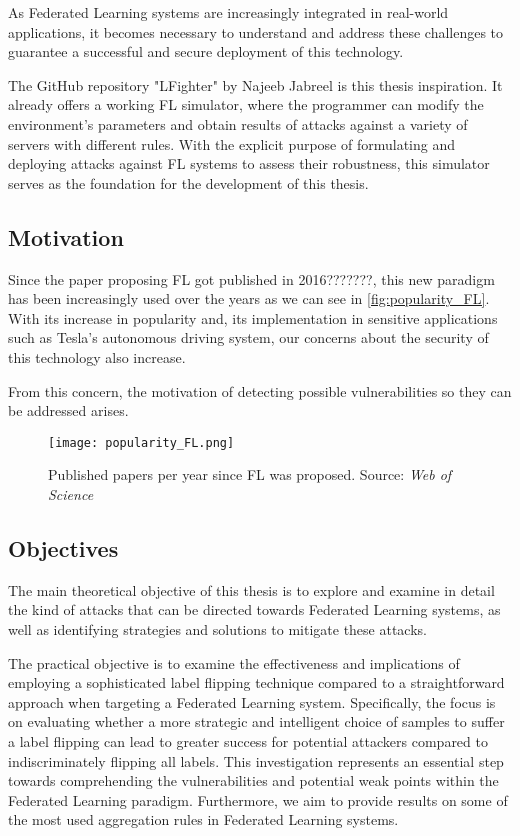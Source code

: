 As Federated Learning systems are increasingly integrated in real-world applications, it becomes necessary to understand and address these challenges to guarantee a successful and secure deployment of this technology.


The GitHub repository "LFighter" \cite{LFighter_code} by Najeeb Jabreel is this thesis inspiration. It already offers a working FL simulator, where the programmer can modify the environment's parameters and obtain results of attacks against a variety of servers with different rules. With the explicit purpose of formulating and deploying attacks against FL systems to assess their robustness, this simulator serves as the foundation for the development of this thesis.



\subsection{Motivation}
Since the paper proposing FL got published in 2016???????, this new paradigm has been increasingly used over the years as we can see in \autoref{fig:popularity_FL}.
With its increase in popularity and, its implementation in sensitive applications such as Tesla's autonomous driving system, our concerns about the security of this technology also increase.

From this concern, the motivation of detecting possible vulnerabilities so they can be addressed arises. 

\begin{figure}[h!]
        \centering %
        \texttt{[image: popularity\_FL.png]}
        \caption{Published papers per year since FL was proposed. Source: \textit{Web of Science}} %
        \label{fig:popularity_FL}
    \end{figure}

\subsection{Objectives}
The main theoretical objective of this thesis is to explore and examine in detail the kind of attacks that can be directed towards Federated Learning systems, as well as identifying strategies and solutions to mitigate these attacks. 

The practical objective is to examine the effectiveness and implications of employing a sophisticated label flipping technique compared to a straightforward approach when targeting a Federated Learning system. Specifically, the focus is on evaluating whether a more strategic and intelligent choice of samples to suffer a label flipping can lead to greater success for potential attackers compared to indiscriminately flipping all labels. This investigation represents an essential step towards comprehending the vulnerabilities and potential weak points within the Federated Learning paradigm. Furthermore, we aim to provide results on some of the most used aggregation rules in Federated Learning systems.


